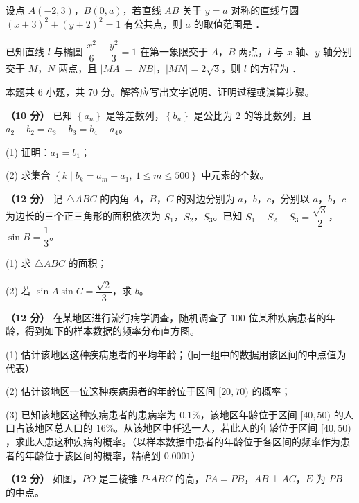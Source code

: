 设点 $A(-2,3)$，$B(0,a)$，若直线 $AB$ 关于 $y=a$ 对称的直线与圆 $(x+3)^{2}+(y+2)^{2}=1$ 有公共点，则 $a$ 的取值范围是 \gkblank{}．

已知直线 $l$ 与椭圆 $\dfrac{x^{2}}6+\dfrac{y^{2}}3=1$ 在第一象限交于 $A$，$B$ 两点，$l$ 与 $x$ 轴、$y$ 轴分别交于 $M$，$N$ 两点，且 $|MA|=|NB|$，$|MN|=2\sqrt3$，则 $l$ 的方程为 \gkblank{}．

\par\medskip


\begin{gktip}
本题共 6 小题，共 70 分。解答应写出文字说明、证明过程或演算步骤。
\end{gktip}

\textbf{（10 分）} 已知 $\left\{a_n\right\}$ 是等差数列，$\left\{b_n\right\}$ 是公比为 $2$ 的等比数列，且 $a_2-b_2=a_3-b_3=b_4-a_4$。

  (1) 证明：$a_1=b_1$；

  (2) 求集合 $\left\{k\mid b_k=a_m+a_1,\ 1\le m\le500\right\}$ 中元素的个数。

\textbf{（12 分）} 记 $\triangle ABC$ 的内角 $A$，$B$，$C$ 的对边分别为 $a$，$b$，$c$，分别以 $a$，$b$，$c$ 为边长的三个正三角形的面积依次为 $S_1$，$S_2$，$S_3$。已知 $S_1-S_2+S_3=\dfrac{\sqrt3}2$，$\sin B=\dfrac13$。

  (1) 求 $\triangle ABC$ 的面积；

  (2) 若 $\sin A\sin C=\dfrac{\sqrt2}3$，求 $b$。

\textbf{（12 分）} 在某地区进行流行病学调查，随机调查了 $100$ 位某种疾病患者的年龄，得到如下的样本数据的频率分布直方图。

\begin{center}\end{center}

  (1) 估计该地区这种疾病患者的平均年龄；（同一组中的数据用该区间的中点值为代表）

  (2) 估计该地区一位这种疾病患者的年龄位于区间 $[20,70)$ 的概率；

  (3) 已知该地区这种疾病患者的患病率为 $0.1\%$，该地区年龄位于区间 $[40,50)$ 的人口占该地区总人口的 $16\%$。从该地区中任选一人，若此人的年龄位于区间 $[40,50)$，求此人患这种疾病的概率。（以样本数据中患者的年龄位于各区间的频率作为患者的年龄位于该区间的概率，精确到 $0.0001$）

\textbf{（12 分）} 如图，$PO$ 是三棱锥 $P\text{-}ABC$ 的高，$PA=PB$，$AB\perp AC$，$E$ 为 $PB$ 的中点。

